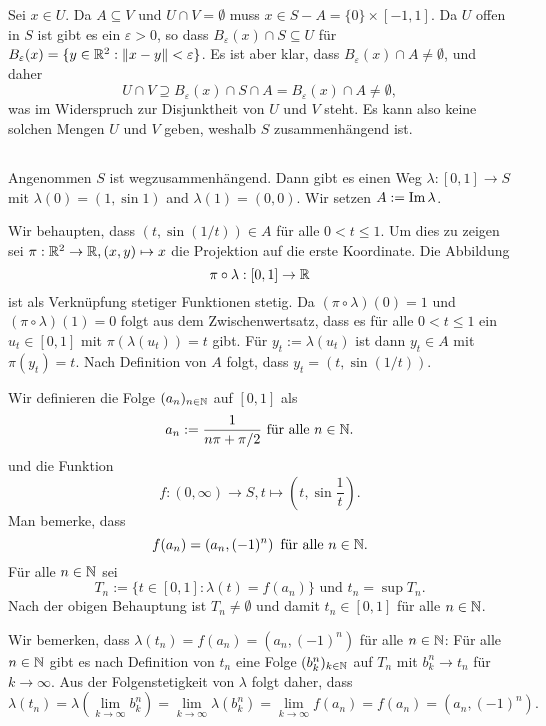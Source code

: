 \documentclass[a4paper,10pt]{article}
\begin{document}
Sei $x \in U$. Da $A \subseteq V$ und $U \cap V = \emptyset$ muss $x \in S-A = \{0\} \times [-1,1]$. Da $U$ offen in $S$ ist gibt es ein $\varepsilon > 0$, so dass $B_\varepsilon(x) \cap S \subseteq U$ für $B_\varepsilon(x) = \{y \in \mathbb{R}^2 : \|x-y\| < \varepsilon\}$. Es ist aber klar, dass $B_\varepsilon(x) \cap A \neq \emptyset$, und daher
\[
 U \cap V \supseteq B_\varepsilon(x) \cap S \cap A = B_\varepsilon(x) \cap A \neq \emptyset,
\]
was im Widerspruch zur Disjunktheit von $U$ und $V$ steht. Es kann also keine solchen Mengen $U$ und $V$ geben, weshalb $S$ zusammenhängend ist.


\subsection{}
Angenommen $S$ ist wegzusammenhängend. Dann gibt es einen Weg $\lambda : [0,1] \to S$ mit $\lambda(0) = (1,\sin 1)$ and $\lambda(1) = (0,0)$. Wir setzen $A := \operatorname{Im} \lambda$.

Wir behaupten, dass $(t, \sin(1/t)) \in A$ für alle $0 < t \leq 1$. Um dies zu zeigen sei $\pi : \mathbb{R}^2 \to \mathbb{R}, (x,y) \mapsto x$ die Projektion auf die erste Koordinate. Die Abbildung
\[
 \pi \circ \lambda : [0,1] \to \mathbb{R}
\]
ist als Verknüpfung stetiger Funktionen stetig. Da $(\pi \circ \lambda)(0) = 1$ und $(\pi \circ \lambda)(1) = 0$ folgt aus dem Zwischenwertsatz, dass es für alle $0 < t \leq 1$ ein $u_t \in [0,1]$ mit $\pi(\lambda(u_t)) = t$ gibt. Für $y_t := \lambda(u_t)$ ist dann $y_t \in A$ mit $\pi(y_t) = t$. Nach Definition von $A$ folgt, dass $y_t = (t,\sin(1/t))$.

Wir definieren die Folge $(a_n)_{n \in \mathbb{N}}$ auf $[0,1]$ als
\[
 a_n := \frac{1}{n\pi + \pi/2} \text{ für alle } n \in \mathbb{N}.
\]
und die Funktion
\[
 f : (0,\infty) \to S, t \mapsto \left(t, \sin \frac{1}{t}\right).
\]
Man bemerke, dass
\[
 f(a_n) = \left(a_n, (-1)^n\right) \text{ für alle } n \in \mathbb{N}.
\]
Für alle $n \in \mathbb{N}$ sei
\[
 T_n := \{t \in [0,1] : \lambda(t) = f(a_n)\} \text{ und }
 t_n = \sup T_n.
\]
Nach der obigen Behauptung ist $T_n \neq \emptyset$ und damit $t_n \in [0,1]$ für alle $n \in \mathbb{N}$.

Wir bemerken, dass $\lambda(t_n) = f(a_n) = (a_n,(-1)^n)$ für alle $n \in \mathbb{N}$: Für alle $n \in \mathbb{N}$ gibt es nach Definition von $t_n$ eine Folge $(b_k^n)_{k \in \mathbb{N}}$ auf $T_n$ mit $b_k^n \to t_n$ für $k \to \infty$. Aus der Folgenstetigkeit von $\lambda$ folgt daher, dass
\[
 \lambda(t_n) = \lambda\left(\lim_{k \to \infty} b_k^n\right) = \lim_{k \to \infty} \lambda(b_k^n) = \lim_{k \to \infty} f(a_n) = f(a_n) = \left(a_n,(-1)^n\right).
\]
\end{document}

